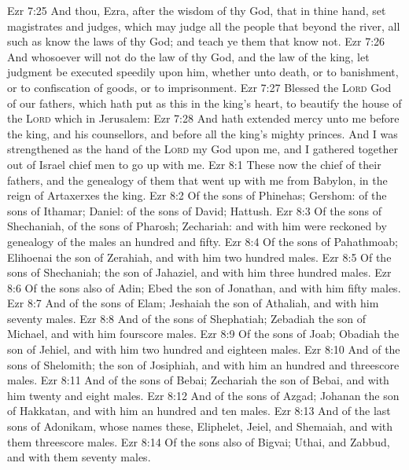 \vs Ezr 7:25 And thou, Ezra, after the wisdom of thy God, that  in thine hand, set magistrates and judges, which may judge all the people that  beyond the river, all such as know the laws of thy God; and teach ye them that know  not.
\vs Ezr 7:26 And whosoever will not do the law of thy God, and the law of the king, let judgment be executed speedily upon him, whether  unto death, or to banishment, or to confiscation of goods, or to imprisonment.
\vs Ezr 7:27 Blessed  the \textsc{Lord} God of our fathers, which hath put  as this in the king's heart, to beautify the house of the \textsc{Lord} which  in Jerusalem:
\vs Ezr 7:28 And hath extended mercy unto me before the king, and his counsellors, and before all the king's mighty princes. And I was strengthened as the hand of the \textsc{Lord} my God  upon me, and I gathered together out of Israel chief men to go up with me.
\vs Ezr 8:1 These  now the chief of their fathers, and  the genealogy of them that went up with me from Babylon, in the reign of Artaxerxes the king.
\vs Ezr 8:2 Of the sons of Phinehas; Gershom: of the sons of Ithamar; Daniel: of the sons of David; Hattush.
\vs Ezr 8:3 Of the sons of Shechaniah, of the sons of Pharosh; Zechariah: and with him were reckoned by genealogy of the males an hundred and fifty.
\vs Ezr 8:4 Of the sons of Pahathmoab; Elihoenai the son of Zerahiah, and with him two hundred males.
\vs Ezr 8:5 Of the sons of Shechaniah; the son of Jahaziel, and with him three hundred males.
\vs Ezr 8:6 Of the sons also of Adin; Ebed the son of Jonathan, and with him fifty males.
\vs Ezr 8:7 And of the sons of Elam; Jeshaiah the son of Athaliah, and with him seventy males.
\vs Ezr 8:8 And of the sons of Shephatiah; Zebadiah the son of Michael, and with him fourscore males.
\vs Ezr 8:9 Of the sons of Joab; Obadiah the son of Jehiel, and with him two hundred and eighteen males.
\vs Ezr 8:10 And of the sons of Shelomith; the son of Josiphiah, and with him an hundred and threescore males.
\vs Ezr 8:11 And of the sons of Bebai; Zechariah the son of Bebai, and with him twenty and eight males.
\vs Ezr 8:12 And of the sons of Azgad; Johanan the son of Hakkatan, and with him an hundred and ten males.
\vs Ezr 8:13 And of the last sons of Adonikam, whose names  these, Eliphelet, Jeiel, and Shemaiah, and with them threescore males.
\vs Ezr 8:14 Of the sons also of Bigvai; Uthai, and Zabbud, and with them seventy males.
